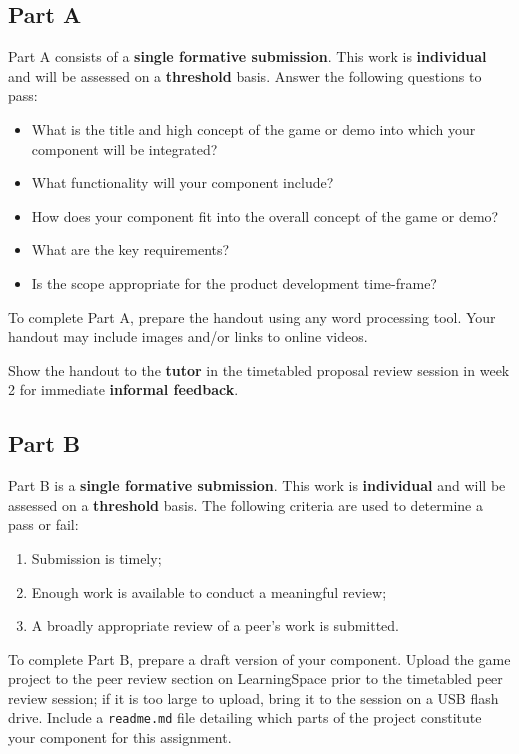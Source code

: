 \documentclass{../../fal_assignment}
\begin{document}
\subsection*{Part A}

Part A consists of a \textbf{single formative submission}. This work is \textbf{individual} and will be assessed on a \textbf{threshold} basis. Answer the following questions to pass:

\begin{itemize}
	\item What is the title and high concept of the game or demo into which your component will be integrated?
	\item What functionality will your component include?
	\item How does your component fit into the overall concept of the game or demo?
	\item What are the key requirements?
	\item Is the scope appropriate for the product development time-frame?
\end{itemize}

To complete Part A, prepare the handout using any word processing tool.
Your handout may include images and/or links to online videos.

Show the handout to the \textbf{tutor} in the timetabled proposal review session in week 2 for immediate \textbf{informal feedback}.

\subsection*{Part B}

Part B is a \textbf{single formative submission}. This work is \textbf{individual} and will be assessed on a \textbf{threshold} basis. The following criteria are used to determine a pass or fail:

\begin{enumerate}[label=(\alph*)]
	\item Submission is timely;
	\item Enough work is available to conduct a meaningful review;
	\item A broadly appropriate review of a peer's work is submitted.
\end{enumerate}

To complete Part B, prepare a draft version of your component.
Upload the game project to the peer review section on LearningSpace prior to the timetabled peer review session;
if it is too large to upload, bring it to the session on a USB flash drive.
Include a \texttt{readme.md} file detailing which parts of the project constitute your component for this assignment.
\end{document}
